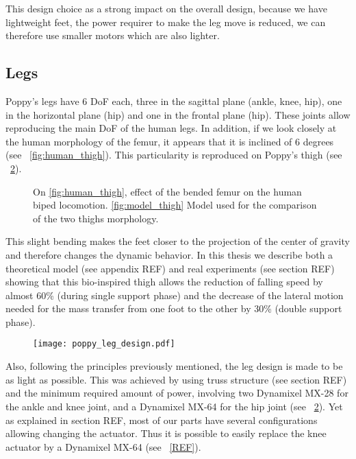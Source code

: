 This design choice as a strong impact on the overall design, because we have lightweight feet, the power requirer to make the leg move is reduced, we can therefore use smaller motors which are also lighter.


\subsection{Legs} %
\label{sub:poppy-leg-design}

Poppy's legs have 6 DoF each, three in the sagittal plane (ankle, knee, hip), one in the horizontal plane (hip) and one in the frontal plane (hip). These joints allow reproducing the main DoF of the human legs. In addition, if we look closely at the human morphology of the femur, it appears that it is inclined of 6 degrees (see \figurename~\ref{fig:human_thigh}). This particularity is reproduced on Poppy's thigh (see \figurename~\ref{fig:poppy_leg_design}).

\begin{figure}[tb]
\centering
    \hfil
    \caption{ On \ref{fig:human_thigh}, effect of the bended femur on the human biped locomotion. \ref{fig:model_thigh} Model used for the comparison of the two thighs morphology.}
    \label{fig:poppy_thigh}
\end{figure}


This slight bending makes the feet closer to the projection of the center of gravity and therefore changes the dynamic behavior.
In this thesis we describe both a theoretical model (see appendix REF) and real experiments (see section REF) showing that this bio-inspired thigh allows the reduction of falling speed by almost 60\% (during single support phase) and the decrease of the lateral motion needed for the mass transfer from one foot to the other by 30\% (double support phase).


\begin{figure}[p]
    \begin{center}
        \texttt{[image: poppy\_leg\_design.pdf]}
    \end{center}
    \caption{}
    \label{fig:poppy_leg_design}
\end{figure}


Also, following the principles previously mentioned, the leg design is made to be as light as possible. This was achieved by using truss structure (see section REF) and the minimum required amount of power, involving two Dynamixel MX-28 for the ankle and knee joint, and a Dynamixel MX-64 for the hip joint (see \figurename~\ref{fig:poppy_leg_design}). Yet as explained in section REF, most of our parts have several configurations allowing changing the actuator. Thus it is possible to easily replace the knee actuator by a Dynamixel MX-64 (see \figurename~\ref{REF}).



